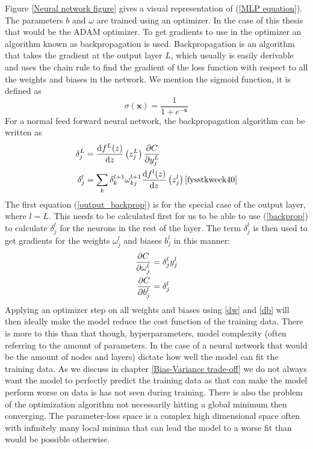 Figure \ref{Neural network figure} gives a visual representation of (\ref{MLP equation}).
The parameters $b$ and $\omega$ are trained using an optimizer. In the case of this 
thesis that would be the ADAM optimizer. To get gradients to use in the optimizer 
an algorithm known as backpropagation is used. Backpropagation is an algorithm that 
takes the gradient at the output layer $L$, which usually is easily derivable and 
uses the chain rule to find the gradient of the loss function with respect to all 
the weights and biases in the network.
We mention the sigmoid function, it is defined as
\begin{equation}
	\sigma(\bm{x}) = \frac{1}{1 + e^{-\bm{x}}} \label{sigmoid}
\end{equation}
For a normal feed forward neural network, the backpropagation algorithm can be written 
as 
\begin{align}
    \delta^L_j &= \dv{f^L(z)}{z}\left(z^L_j\right) \pdv{C}{y^L_j} \label{output_backprop}\\
    \delta^l_j &= \sum_k \delta^{l+1}_k \omega^{l+1}_{kj} \dv{f^l(z)}{z}\left(z^l_j\right) \cite{fysstkweek40} \label{backprop}
\end{align}
The first equation (\ref{output_backprop}) is for the special case of the output 
layer, where $l=L$. This needs to be calculated first for us to be able to use 
(\ref{backprop}) to calculate $\delta^l_j$ for the neurons in the rest of the layer. 
The term $\delta^l_j$ is then used to get gradients for the weights $\omega^l_j$ 
and biases $b^l_j$ in this manner:
\begin{align}
    \pdv{C}{\omega^l_j} &= \delta^l_j y^l_j \label{dw}\\
    \pdv{C}{b^l_j} &= \delta^l_j \label{db}
\end{align}
Applying an optimizer step on all weights and biases using \ref{dw} and \ref{db}
will then ideally make the model reduce the cost function of the training data.
There is more to this than that though, hyperparameters, model complexity (often 
referring to the amount of parameters. In the case of a neural network that would 
be the amount of nodes and layers) dictate how well the model can fit the training 
data. As we discuss in chapter \ref{Bias-Variance trade-off} we do not always want 
the model to perfectly predict the training data as that can make the model perform 
worse on data is has not seen during training. There is also the problem of the 
optimization algorithm not necessarily hitting a global minimum then converging. 
The parameter-loss space is a complex high dimensional space often with infinitely 
many local minima that can lead the model to a worse fit than would be possible 
otherwise. \citationneeded
